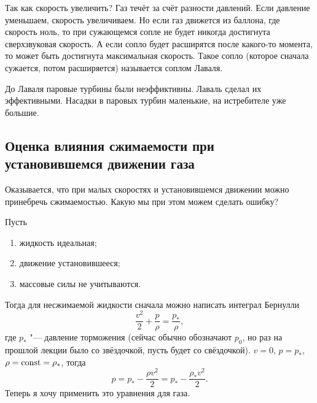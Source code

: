 \begin{roItems}
Так как скорость увеличить? Газ течёт за счёт разности давлений. Если давление уменьшаем, скорость увеличиваем. Но если газ движется из баллона, где скорость ноль, то при сужающемся сопле не будет никогда достигнута сверхзвуковая скорость. А если сопло будет расширятся после какого-то момента, то может быть достигнута максимальная скорость. Такое сопло (которое сначала сужается, потом расширяется) называется соплом Лаваля.
\end{roItems}
До Лаваля паровые турбины были неэффиктивны. Лаваль сделал их эффективными. Насадки в паровых турбин маленькие, на истребителе уже большие.

\subsection{Оценка влияния сжимаемости при установившемся движении газа}
Оказывается, что при малых скоростях и установившемся движении можно принебречь сжимаемостью. Какую мы при этом можем сделать ошибку?

Пусть 
\begin{enumerate}
\item жидкость идеальная;
\item движение установившееся;
\item массовые силы не учитываются.
\end{enumerate}
Тогда для несжимаемой жидкости сначала можно написать интеграл Бернулли
\[
  \frac{v^2}2+\frac{p}\rho = \frac{p_*}\rho,
\]
где $p_*$ "--- давление торможения (сейчас обычно обозначают $p_0$, но раз на прошлой лекции было со звёздочкой, пусть будет со свёздочкой). $v=0$, $p=p_*$, $\rho = \operatorname{const}=\rho_*$, тогда 
\[
  p = p_* - \frac{\rho v^2}2=p_*-\frac{\rho_*v^2}2.
\]
Теперь я хочу применить это уравнения для газа.

